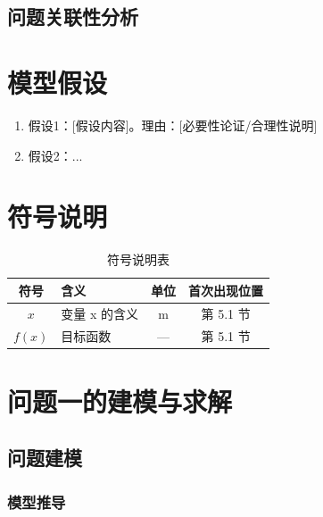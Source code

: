 \documentclass[12pt,a4paper]{ctexart}
\begin{document}
\subsection{问题关联性分析}  %


\section{模型假设}
\begin{enumerate}
    \item 假设1：[假设内容]。理由：[必要性论证/合理性说明]
    \item 假设2：...
\end{enumerate}

\section{符号说明}
\begin{table}[H]
    \centering
    \caption{符号说明表}
    \label{tab:symbols}
    \begin{tabular}{clcc}
        \toprule
        \textbf{符号} & \textbf{含义} & \textbf{单位} & \textbf{首次出现位置} \\
        \midrule
        $x$ & 变量 x 的含义 & m & 第 5.1 节 \\
        $f(x)$ & 目标函数 & — & 第 5.1 节 \\
        \bottomrule
    \end{tabular}
\end{table}

\section{问题一的建模与求解}
\subsection{问题建模}
\subsubsection{模型推导}  %
\end{document}

